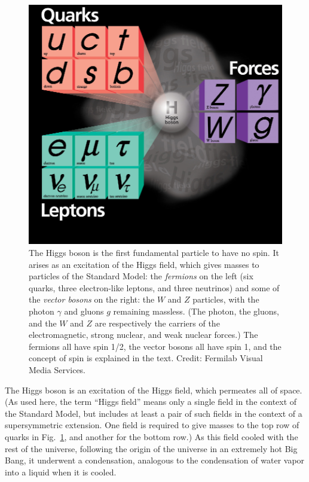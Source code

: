 \documentclass[12pt]{iopart}
\begin{document}
\begin{figure}[htbp]
\centering
\includegraphics[bb=0 0 360 325, width=5in]{Fig1-FN0266H.eps}
\caption{The Higgs boson is the first fundamental particle to have no spin. It arises as an excitation of the Higgs field, which gives masses to  particles of the Standard Model: the \textit{fermions} on the left (six quarks, three electron-like leptons, and three neutrinos) and some of the  \textit{vector bosons} on the right: the $W$ and $Z$ particles, with the photon $\gamma$ and gluons $g$ remaining massless.  (The photon, the gluons, and the $W$ and $Z$ are respectively the carriers of the electromagnetic, strong nuclear, and weak nuclear forces.) The fermions all have spin 1/2, the vector bosons all have spin 1, and the  concept of spin is explained in the text. Credit: Fermilab Visual Media Services. \label{Fig1-FN0266H}}
\end{figure}

The Higgs boson is an excitation of the Higgs field, which permeates all of space. (As used here, the term ``Higgs field'' means only a single field in the context of the Standard Model, but includes at least a pair of such fields in the context of a supersymmetric extension.  One field is required to give masses to the top row of quarks in Fig.~\ref{Fig1-FN0266H}, and another for the bottom row.) As this field cooled with the rest of the universe, following the origin of the universe in an extremely hot Big Bang, it underwent a condensation, analogous to the condensation of water vapor into a liquid when it is cooled. 
\end{document}
